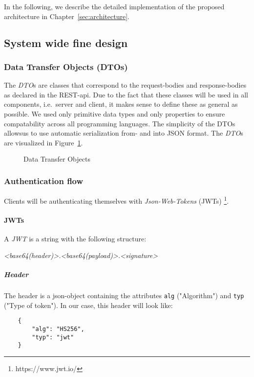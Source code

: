 In the following, we describe the detailed implementation of the proposed architecture in Chapter~\ref{sec:architecture}.

\subsection{System wide fine design}\label{subsec:system-wide-design}

\subsubsection{Data Transfer Objects (DTOs)}
The \textit{DTO}s are classes that correspond to the request-bodies and response-bodies as declared in the REST-api. \newline
Due to the fact that these classes will be used in all components, i.e.\ server and client, it makes sense to define these as general as possible.
We used only primitive data types and only properties to ensure compatability across all programming languages. \newline
The simplicity of the DTOs allowsus to use automatic serialization from- and into JSON format.
The \textit{DTO}s are visualized in Figure~\ref{fig:dtos}.

\begin{figure}
    \centering

    \caption{Data Transfer Objects}
    \label{fig:dtos}
\end{figure}

\subsubsection{Authentication flow}
Clients will be authenticating themselves with \textit{Json-Web-Tokens} (JWTs) \footnote{https://www.jwt.io/}.

\paragraph{JWTs}
A \textit{JWT} is a string with the following structure: \newline
\begin{center}
    \textit{\textless base64(header)\textgreater.\textless base64(payload)\textgreater.\textless signature\textgreater}
\end{center}

\subparagraph{Header}
The header is a json-object containing the attributes \texttt{alg} ("Algorithm") and \texttt{typ} ("Type of token").
In our case, this header will look like:
\begin{verbatim}
    {
        "alg": "HS256",
        "typ": "jwt"
    }
\end{verbatim}

